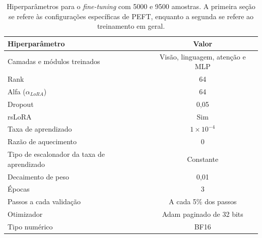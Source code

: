\clearpage

\begin{table}[ht]
    \caption{\small Hiperparâmetros para o \textit{fine-tuning} com 5000 e 9500 amostras. A primeira seção se refere às configurações específicas de \ac{PEFT}, enquanto
        a segunda se refere ao treinamento em geral.}
    \centering
    \begin{tabular}{l|c}
        \hline
        Hiperparâmetro                             & Valor                                  \\ \hline
        Camadas e módulos treinados                & Visão, linguagem, atenção e \ac{MLP}   \\
        Rank                                       & 64                                     \\
        Alfa (\begin{math}\alpha_{LoRA}\end{math}) & 64                                     \\
        Dropout                                    & 0,05                                   \\
        \ac{rsLoRA}                                & Sim                                    \\ \hline
        Taxa de aprendizado                        & \begin{math}1 \times 10^{-4}\end{math} \\
        Razão de aquecimento                       & 0                                      \\
        Tipo de escalonador da taxa de aprendizado & Constante                              \\
        Decaimento de peso                         & 0,01                                   \\
        Épocas                                     & 3                                      \\
        Passos a cada validação                    & A cada 5\% dos passos                  \\
        Otimizador                                 & \ac{Adam} paginado de 32 bits          \\
        Tipo numérico                              & \ac{BF16}                              \\ \hline
    \end{tabular}
    \label{tab:qlora_5000_config}
\end{table}

